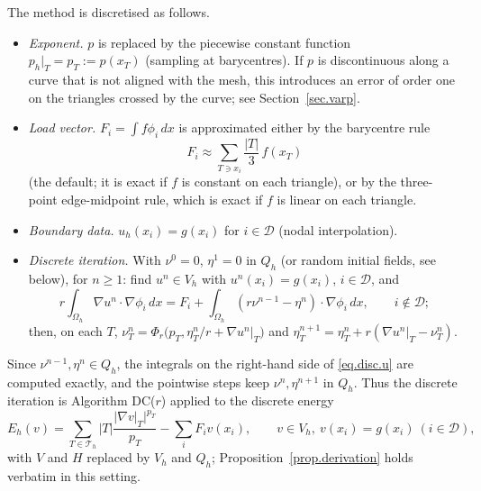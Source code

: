 \documentclass[11pt]{amsart}
\newcommand{\T}{\mathcal T}
\newcommand{\dx}{\,dx}
\theoremstyle{definition}
\theoremstyle{remark}
\numberwithin{equation}{section}
\begin{document}
The method is discretised as follows.
\begin{itemize}
\item \emph{Exponent.} $p$ is replaced by the piecewise constant function $p_h|_T=p_T:=p(x_T)$ (sampling at barycentres). If $p$ is discontinuous along a curve that is not aligned with the mesh, this introduces an error of order one on the triangles crossed by the curve; see Section~\ref{sec.varp}.
\item \emph{Load vector.} $F_i=\int f\phi_i\dx$ is approximated either by the barycentre rule
$$
F_i\approx\sum_{T\ni x_i}\frac{|T|}{3}\,f(x_T)
$$
(the default; it is exact if $f$ is constant on each triangle), or by the three-point edge-midpoint rule, which is exact if $f$ is linear on each triangle.
\item \emph{Boundary data.} $u_h(x_i)=g(x_i)$ for $i\in\mathcal D$ (nodal interpolation).
\item \emph{Discrete iteration.} With $\nu^0=0$, $\eta^1=0$ in $Q_h$ (or random initial fields, see below), for $n\ge1$: find $u^n\in V_h$ with $u^n(x_i)=g(x_i)$, $i\in\mathcal D$, and
\begin{equation}\label{eq.disc.u}
r\int_{\Omega_h}\nabla u^n\cdot\nabla\phi_i\dx=F_i+\int_{\Omega_h}(r\nu^{n-1}-\eta^n)\cdot\nabla\phi_i\dx,\qquad i\notin\mathcal D;
\end{equation}
then, on each $T$, $\nu^n_T=\Phi_r\big(p_T,\eta^n_T/r+\nabla u^n|_T\big)$ and $\eta^{n+1}_T=\eta^n_T+r(\nabla u^n|_T-\nu^n_T)$.
\end{itemize}
Since $\nu^{n-1},\eta^n\in Q_h$, the integrals on the right-hand side of \eqref{eq.disc.u} are computed exactly, and the pointwise steps keep $\nu^n,\eta^{n+1}$ in $Q_h$. Thus the discrete iteration is Algorithm DC($r$) applied to the discrete energy
$$
E_h(v)=\sum_{T\in\T_h}|T|\frac{|\nabla v|_T|^{p_T}}{p_T}-\sum_{i}F_iv(x_i),\qquad v\in V_h,\ v(x_i)=g(x_i)\ (i\in\mathcal D),
$$
with $V$ and $H$ replaced by $V_h$ and $Q_h$; Proposition~\ref{prop.derivation} holds verbatim in this setting.
\end{document}
